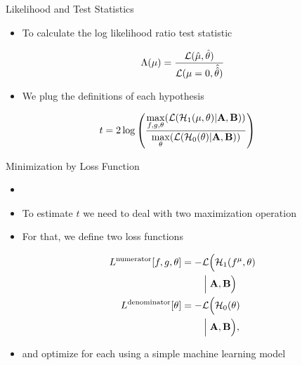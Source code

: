 \documentclass[notheorems]{beamer}
\begin{document}
\begin{frame}{Likelihood and Test Statistics}
    \begin{itemize}
        \item To calculate the log likelihood ratio test statistic
    \end{itemize}
    \begin{equation}
        \Lambda({\mu}) = \dfrac{
            \mathcal{L}(\hat{{\mu}},\hat{{\theta}})
        }{
            \mathcal{L}({\mu} = 0, \hat{\hat{{\theta}}})
        }
    \end{equation}
    \begin{itemize}
        \item We plug the definitions of each hypothesis
    \end{itemize}
    \begin{equation}
    \begin{aligned}
        t &= 2 \log \left(
            \frac{
                \max\limits_{f, g, {\theta}} (\mathcal{L}({\mathcal{H}_{1}}({\mu}, {\theta})|{\mathbf{A}}, {\mathbf{B}}))
            }{
                \max\limits_{{\theta}} (\mathcal{L}({{\mathcal{H}_{0}}}({\theta})|{\mathbf{A}}, {\mathbf{B}}))
        }\right)
    \end{aligned}
    \end{equation}
\end{frame}

\begin{frame}{Minimization by Loss Function}
    \begin{itemize}
        \item {}
        \item To estimate $t$ we need to deal with two maximization operation
        \item For that, we define two loss functions
    \end{itemize}
    {\scriptsize
    \begin{equation}
    \begin{aligned}
        L^\text{numerator}[f, g, {\theta}]
            &= -\mathcal{L}\Bigl({\mathcal{H}_{1}}({f^{{\mu}}}, {\theta}) \\
            &\qquad\Bigm| {\mathbf{A}}, {\mathbf{B}}\Bigr) \\
        L^\text{denominator}[{\theta}]
            &= -\mathcal{L}\Bigl({{\mathcal{H}_{0}}}({\theta}) \\
            &\qquad\Bigm| {\mathbf{A}}, {\mathbf{B}}\Bigr),
    \end{aligned}
    \end{equation}
    }
    \begin{itemize}
        \item and optimize for each using a simple machine learning model
    \end{itemize}
\end{frame}
\end{document}
